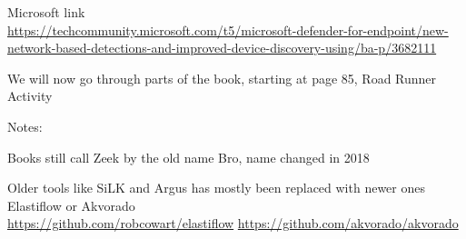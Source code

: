 \documentclass[Screen16to9,17pt]{foils}
\begin{document}
\begin{list2}
\item Microsoft link\\{\scriptsize
\url{https://techcommunity.microsoft.com/t5/microsoft-defender-for-endpoint/new-network-based-detections-and-improved-device-discovery-using/ba-p/3682111}}
\end{list2}



We will now go through parts of the book, starting at page 85, Road Runner Activity

Notes:
\begin{list2}
\item Books still call Zeek by the old name Bro, name changed in 2018
\item Older tools like SiLK and Argus has mostly been replaced with newer ones Elastiflow or Akvorado\\
\url{https://github.com/robcowart/elastiflow} \url{https://github.com/akvorado/akvorado}
\end{list2}



\end{document}
